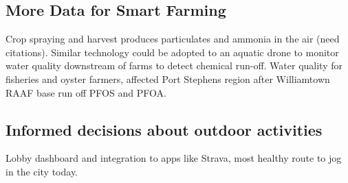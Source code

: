 
\subsection{More Data for Smart Farming}

Crop spraying and harvest produces particulates and ammonia in the air (need citations). Similar technology could be adopted to an aquatic drone to monitor water quality downstream of farms to detect chemical run-off. Water quality for fisheries and oyster farmers, affected Port Stephens region after Williamtown RAAF base run off PFOS and PFOA.


\subsection{Informed decisions about outdoor activities}

Lobby dashboard and integration to apps like Strava, most healthy route to jog in the city today.